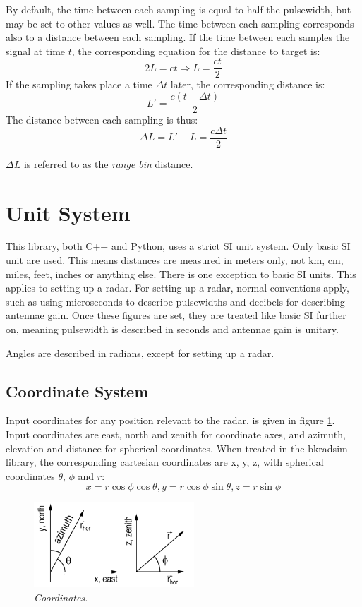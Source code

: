 \documentclass[letterpaper]{book}
\begin{document}
By default, the time between each sampling is equal to half the pulsewidth, but may be set to other values as well. The time between each sampling corresponds also to a distance between each sampling. If the time between each samples the signal at time \(t\), the corresponding equation for the distance to target is:
\begin{equation}
2L = ct \Rightarrow L = \frac{ct}{2}
\end{equation}
If the sampling takes place a time \(\Delta t\) later, the corresponding distance is:
\begin{equation}
L' = \frac{c(t + \Delta t)}{2}
\end{equation}
The distance between each sampling is thus:
\begin{equation}
\Delta L = L' - L = \frac{c\Delta t}{2}
\end{equation}

\(\Delta L\) is referred to as the \textit{range bin} distance. 


\section{Unit System}
This library, both C++ and Python, uses a strict SI unit system. Only basic SI unit are used. This means distances are measured in meters only, not km, cm, miles, feet, inches or anything else. There is one exception to basic SI units. This applies to setting up a radar. For setting up a radar, normal conventions apply, such as using microseconds to describe pulsewidths and decibels for describing antennae gain. Once these figures are set, they are treated like basic SI further on, meaning pulsewidth is described in seconds and antennae gain is unitary. 

Angles are described in radians, except for setting up a radar. 

\subsection{Coordinate System}
Input coordinates for any position relevant to the radar, is given in figure \ref{fig:coordinates}. Input coordinates are east, north and zenith for coordinate axes, and azimuth, elevation and distance for spherical coordinates. When treated in the bkradsim library, the corresponding cartesian coordinates are x, y, z, with spherical coordinates \(\theta\), \(\phi\) and \(r\):
\begin{equation}
  x = r \cos{\phi}\cos{\theta}, y = r \cos{\phi}\sin{\theta}, z = r\sin{\phi}
\end{equation}
\begin{figure}
  \includegraphics[width=6cm]{axes.png}
  \caption{\textit{Coordinates.}}
  \label{fig:coordinates}
\end{figure}
\end{document}
